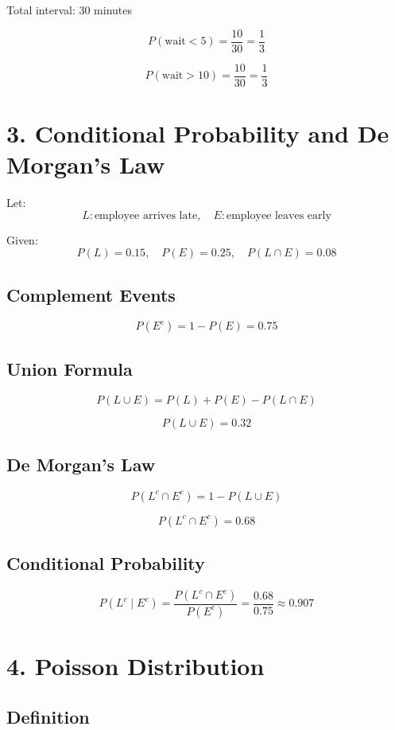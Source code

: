 \documentclass[12pt]{article}
\begin{document}
Total interval: 30 minutes

\[
P(\text{wait} < 5) = \frac{10}{30} = \frac{1}{3}
\]

\[
P(\text{wait} > 10) = \frac{10}{30} = \frac{1}{3}
\]

\section*{3. Conditional Probability and De Morgan's Law}

Let:
\[
L: \text{employee arrives late}, \quad
E: \text{employee leaves early}
\]

Given:
\[
P(L)=0.15, \quad P(E)=0.25, \quad P(L \cap E)=0.08
\]

\subsection*{Complement Events}

\[
P(E^c) = 1 - P(E) = 0.75
\]

\subsection*{Union Formula}

\[
P(L \cup E) = P(L) + P(E) - P(L \cap E)
\]

\[
P(L \cup E) = 0.32
\]

\subsection*{De Morgan's Law}

\[
P(L^c \cap E^c) = 1 - P(L \cup E)
\]

\[
P(L^c \cap E^c) = 0.68
\]

\subsection*{Conditional Probability}

\[
P(L^c \mid E^c) = 
\frac{P(L^c \cap E^c)}{P(E^c)} 
= \frac{0.68}{0.75} \approx 0.907
\]

\section*{4. Poisson Distribution}

\subsection*{Definition}
\end{document}
